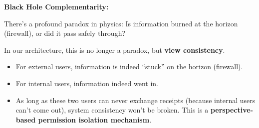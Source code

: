 \textbf{Black Hole Complementarity:}

There's a profound paradox in physics: Is information burned at the horizon (firewall), or did it pass safely through?

In our architecture, this is no longer a paradox, but \textbf{view consistency}.

\begin{itemize}
\item For external users, information is indeed ``stuck'' on the horizon (firewall).

\item For internal users, information indeed went in.

\item As long as these two users can never exchange receipts (because internal users can't come out), system consistency won't be broken. This is a \textbf{perspective-based permission isolation mechanism}.
\end{itemize}

